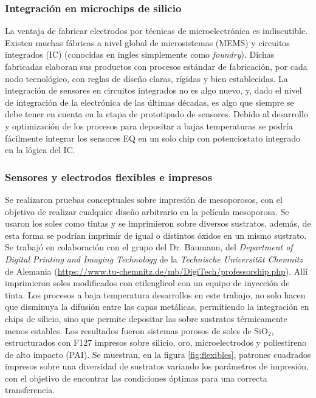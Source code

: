 	\subsubsection{Integración en microchips de silicio}

	  La ventaja de fabricar electrodos por técnicas de microelectrónica es indiscutible. Existen muchas fábricas a nivel global de microsistemas (MEMS) y circuitos integrados (IC) (conocidas en ingles simplemente como \textit{foundry}). Dichas fabricadas elaboran sus productos con procesos estándar de fabricación, por cada nodo tecnológico, con reglas de diseño claras, rígidas y bien establecidas. La integración de sensores en circuitos integrados no es algo nuevo, y, dado el nivel de integración de la electrónica de las últimas décadas, es algo que siempre se debe tener en cuenta en la etapa de prototipado de sensores.\cite{Wang2012,Liu1993,Novell2012,Yu2013,Sarkar2014} Debido al desarrollo y optimización de los procesos para depositar \pdm\space a bajas temperaturas se podría fácilmente integrar los sensores EQ en un solo chip con potenciostato integrado en la lógica del IC.
 	
 	\subsubsection{Sensores y electrodos flexibles e impresos}

 	  Se realizaron pruebas conceptuales sobre impresión de mesoporosos, con el objetivo de realizar cualquier diseño arbitrario en la película mesoporosa. Se usaron los soles como tintas y se imprimieron sobre diversos sustratos, además, de esta forma se podrían imprimir \pdm\space de igual o distintos óxidos en un mismo sustrato. Se trabajó en colaboración con el grupo del Dr. Baumann, del \textit{Department of Digital Printing and Imaging Technology} de la \textit{Technische Universität Chemnitz} de Alemania (\url{https://www.tu-chemnitz.de/mb/DigiTech/professorship.php}). Allí imprimieron soles modificados con etilenglicol con un equipo de inyección de tinta. Los procesos a baja temperatura desarrollos en este trabajo, no solo hacen que disminuya la difusión entre las capas metálicas, permitiendo la integración en chips de silicio, sino que permite depositar las \pdm\space sobre sustratos térmicamente menos estables. Los resultados fueron sistemas porosos de soles de SiO$_2$, estructurados con F127 impresos sobre silicio, oro, microelectrodos y poliestireno de alto impacto (PAI). Se muestran, en la figura \ref{fig:flexibles}, patrones cuadrados impresos sobre una diversidad de sustratos variando los parámetros de impresión, con el objetivo de encontrar las condiciones óptimas para una correcta transferencia.

